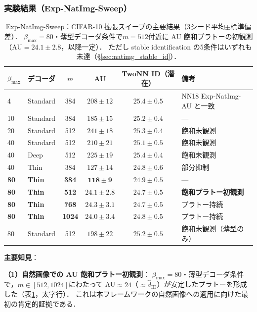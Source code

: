 \documentclass[11pt,a4paper]{jsarticle}
\begin{document}
\subsubsection*{実験結果（Exp-NatImg-Sweep）}

\begin{table}[H]
\centering
\caption{Exp-NatImg-Sweep：CIFAR-10 拡張スイープの主要結果（3シード平均$\pm$標準偏差）．
$\beta_{\max}=80$・薄型デコーダ条件で$m=512$付近に AU 飽和プラトーの初観測（AU$=24.1\pm2.8$，以降一定）．
ただし stable identification の5条件はいずれも未達（§\ref{sec:natimg_stable_id}）．}
\label{tab:natimg_sweep}
\small
\begin{tabular}{llcccl}
\toprule
$\beta_{\max}$ & デコーダ & $m$ & AU & TwoNN ID（潜在） & 備考 \\
\midrule
4  & Standard & 384 & $208\pm12$ & $25.4\pm0.5$ & NN18 Exp-NatImg-AU と一致 \\
10 & Standard & 384 & $185\pm15$ & $25.2\pm0.4$ & --- \\
20 & Standard & 512 & $241\pm18$ & $25.3\pm0.4$ & 飽和未観測 \\
40 & Standard & 512 & $210\pm21$ & $25.1\pm0.5$ & 飽和未観測 \\
40 & Deep      & 512 & $225\pm19$ & $25.4\pm0.4$ & 飽和未観測 \\
40 & Thin      & 384 & $127\pm14$ & $24.8\pm0.6$ & 部分抑制 \\
\textbf{80} & \textbf{Thin} & \textbf{384} & $\boldsymbol{118\pm9}$ & $24.9\pm0.5$ & --- \\
\textbf{80} & \textbf{Thin} & \textbf{512} & $\boldsymbol{24.1\pm2.8}$ & $24.7\pm0.5$ & \textbf{飽和プラトー初観測} \\
\textbf{80} & \textbf{Thin} & \textbf{768} & $\boldsymbol{24.3\pm3.1}$ & $24.7\pm0.5$ & プラトー持続 \\
\textbf{80} & \textbf{Thin} & \textbf{1024}& $\boldsymbol{24.0\pm3.4}$ & $24.8\pm0.5$ & プラトー持続 \\
80 & Standard  & 512 & $198\pm22$ & $25.2\pm0.5$ & 飽和未観測（薄型のみ） \\
\bottomrule
\end{tabular}
\end{table}

\textbf{主要知見}：

\textbf{（1）自然画像での AU 飽和プラトー初観測}：
$\beta_{\max}=80$・薄型デコーダ条件で，$m \in [512, 1024]$にわたって
AU$\approx 24$（$\approx \hat{d}_\mathrm{ID}$）が安定したプラトーを形成した（表\ref{tab:natimg_sweep}，太字行）．
これは本フレームワークの自然画像への適用に向けた最初の肯定的証拠である．
\end{document}
